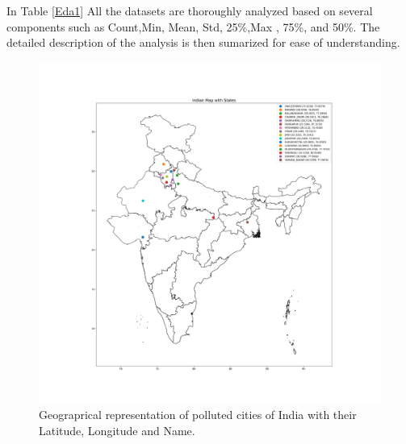 \documentclass[a4paper,fleqn]{cas-sc}
\begin{document}
In Table \ref{Eda1} All the datasets are thoroughly analyzed based on several components such as Count,Min, Mean, Std,  25\%,Max , 75\%, and 50\%. The detailed description of the analysis is then sumarized for ease of understanding.
\begin{figure}[h!]
	\centering
		\includegraphics[scale=0.3]{img/india_map}
	  \caption{ Geograprical representation of polluted cities of India with their Latitude, Longitude and Name. }\label{India map}
\end{figure}
\end{document}
